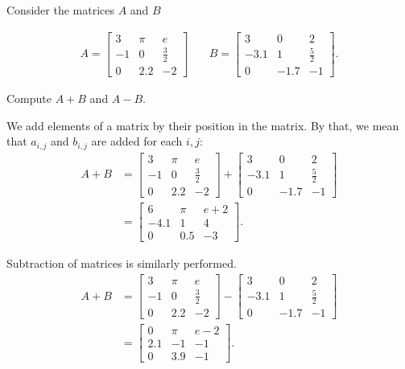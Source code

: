 {Consider the matrices $A$ and $B$

\begin{align}  
A= 
\begin{bmatrix}
	3 & \pi & e \\
	-1 &0 & \frac{3}{2}\\
	0 & 2.2 & -2
\end{bmatrix}
&
\quad B=
\begin{bmatrix}
	3 & 0 & 2 \\
	-3.1 & 1 & \frac{5}{2}\\
	0 & -1.7 & -1	
\end{bmatrix}.
\end{align}

Compute $A+B$ and $A-B$.
}
{
We add elements of a matrix by their position in the matrix.  By that, we mean that $a_{i,j}$ and $b_{i,j}$ are added for each $i,j$:
\begin{align}  
A+B &=  
\begin{bmatrix}
	3 & \pi & e \\
	-1 &0 & \frac{3}{2}\\
	0 & 2.2 & -2
\end{bmatrix}
+ 
\begin{bmatrix}
	3 & 0 & 2 \\
	-3.1 & 1 & \frac{5}{2}\\
	0 & -1.7 & -1	
\end{bmatrix}\\
&= \begin{bmatrix}
	6 & \pi &e + 2 \\
	-4.1 & 1 & 4 \\
	0 & 0.5 & -3
\end{bmatrix}.
\end{align}

Subtraction of matrices is similarly performed.  
\begin{align}  
A+B &=  
\begin{bmatrix}
	3 & \pi & e \\
	-1 &0 & \frac{3}{2}\\
	0 & 2.2 & -2
\end{bmatrix}
-
\begin{bmatrix}
	3 & 0 & 2 \\
	-3.1 & 1 & \frac{5}{2}\\
	0 & -1.7 & -1	
\end{bmatrix}\\
&= \begin{bmatrix}
	0 & \pi &e - 2 \\
	2.1 & -1 & -1 \\
	0 & 3.9 & -1
\end{bmatrix}.
\end{align}
}\\



